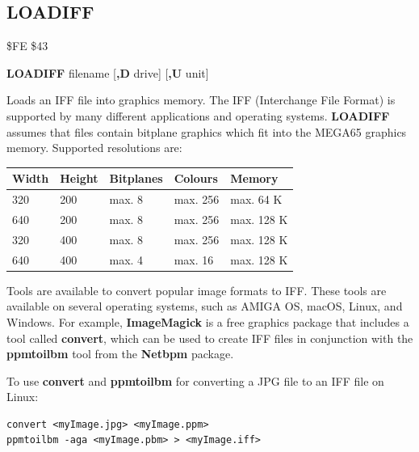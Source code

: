 \subsection{LOADIFF}
\begin{description}[leftmargin=2cm,style=nextline]
\item [Token:] \$FE \$43
\item [Format:] {\bf LOADIFF} filename [{\bf,D} drive] [{\bf,U} unit]
\item [Usage:]

   Loads an IFF file into graphics memory.
   The IFF (Interchange File Format) is supported by many different applications
   and operating systems. {\bf LOADIFF} assumes that files
   contain bitplane graphics which fit into the MEGA65 graphics memory.
   Supported resolutions are:
\begin{center}
\setlength{\tabcolsep}{1mm}
\begin{tabular}{|l|l|l|l|l|}
\hline
{\bf Width}             & {\bf Height} & {\bf Bitplanes} & {\bf Colours} & {\bf Memory} \\
\hline
320                     &  200    & max. 8     & max. 256 & max. 64 K \\
640                     &  200    & max. 8     & max. 256 & max. 128 K \\
320                     &  400    & max. 8     & max. 256 & max. 128 K \\
640                     &  400    & max. 4     & max.  16 & max. 128 K \\
\hline
\end{tabular}
\end{center}

   \filenamedefinition

   \drivedefinition

   \unitdefinition

\item [Remarks:]
   Tools are available to convert popular image formats to IFF. These tools
   are available on several operating systems, such as AMIGA OS, macOS, Linux, and Windows.
   For example, {\bf ImageMagick} is a free graphics package that includes a tool
   called {\bf convert}, which can be used to create IFF files in conjunction
   with the {\bf ppmtoilbm} tool from the {\bf Netbpm} package.

To use {\bf convert} and {\bf ppmtoilbm} for converting a JPG file to an IFF file on Linux:

\begin{verbatim}
convert <myImage.jpg> <myImage.ppm>
ppmtoilbm -aga <myImage.pbm> > <myImage.iff>
\end{verbatim}


\end{description}
